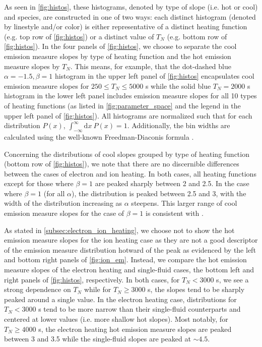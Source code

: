 \documentclass[apj]{emulateapj}
\begin{document}
	\par As seen in \autoref{fig:histos}, these histograms, denoted by type of slope (i.e. hot or cool) and species, are constructed in one of two ways: each distinct histogram (denoted by linestyle and/or color) is either representative of a distinct heating function (e.g. top row of \autoref{fig:histos}) or a distinct value of $T_N$ (e.g. bottom row of \autoref{fig:histos}). In the four panels of \autoref{fig:histos}, we choose to separate the cool emission measure slopes by type of heating function and the hot emission measure slopes by $T_N$. This means, for example, that the dot-dashed blue $\alpha=-1.5,\beta=1$ histogram in the upper left panel of \autoref{fig:histos} encapsulates cool emission measure slopes for $250\le T_N\le5000$ s while the solid blue $T_N=2000$ s histogram in the lower left panel includes emission measure slopes for all 10 types of heating functions (as listed in \autoref{fig:parameter_space} and the legend in the upper left panel of \autoref{fig:histos}). All histograms are normalized such that for each distribution $P(x)$, $\int_{-\infty}^{\infty}\mathrm{d}x~P(x)=1$. Additionally, the bin widths are calculated using the well-known Freedman-Diaconis formula \citep{freedman_histogram_1981}.
	\par Concerning the distributions of cool slopes grouped by type of heating function (bottom row of \autoref{fig:histos}), we note that there are no discernible differences between the cases of electron and ion heating. In both cases, all heating functions except for those where $\beta=1$ are peaked sharply between 2 and 2.5. In the case where $\beta=1$ (for all $\alpha$), the distribution is peaked between 2.5 and 3, with the width of the distribution increasing as $\alpha$ steepens. This larger range of cool emission measure slopes for the case of $\beta=1$ is consistent with \citet{cargill_active_2014}.
	\par As stated in \autoref{subsec:electron_ion_heating}, we choose not to show the hot emission measure slopes for the ion heating case as they are not a good descriptor of the emission measure distribution hotward of the peak as evidenced by the left and bottom right panels of \autoref{fig:ion_em}. Instead, we compare the hot emission measure slopes of the electron heating and single-fluid cases, the bottom left and right panels of \autoref{fig:histos}, respectively. In both cases, for $T_N<3000$ s, we see a strong dependence on $T_N$ while for $T_N\ge3000$ s, the slopes tend to be sharply peaked around a single value. In the electron heating case, distributions for $T_N<3000$ s tend to be more narrow than their single-fluid counterparts and centered at lower values (i.e. more shallow hot slopes). Most notably, for $T_N\ge4000$ s, the electron heating hot emission measure slopes are peaked between 3 and 3.5 while the single-fluid slopes are peaked at $\sim4.5$. 
\end{document}
